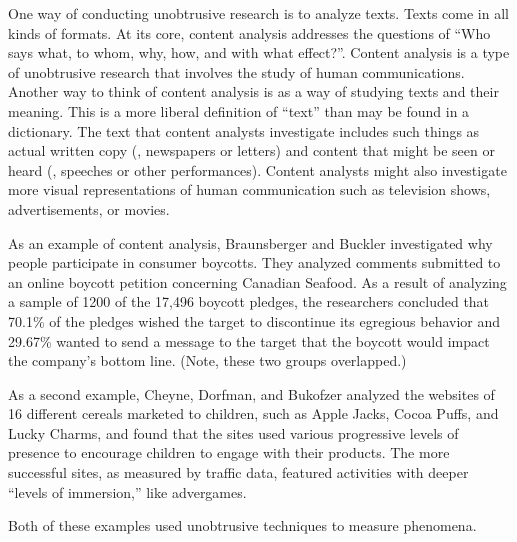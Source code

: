 One way of conducting unobtrusive research is to analyze texts. Texts come in all kinds of formats. At its core, content analysis addresses the questions of ``Who says what, to whom, why, how, and with what effect?''\cite{babbie2010practice}. Content analysis is a type of unobtrusive research that involves the study of human communications. Another way to think of content analysis is as a way of studying texts and their meaning. This is a more liberal definition of ``text'' than may be found in a dictionary. The text that content analysts investigate includes such things as actual written copy (\eg, newspapers or letters) and content that might be seen or heard (\eg, speeches or other performances). Content analysts might also investigate more visual representations of human communication such as television shows, advertisements, or movies.

As an example of content analysis, Braunsberger and Buckler \cite{braunsberger2011motivates} investigated why people participate in consumer boycotts. They analyzed comments submitted to an online boycott petition concerning Canadian Seafood. As a result of analyzing a sample of 1200 of the 17,496 boycott pledges, the researchers concluded that 70.1\% of the pledges wished the target to discontinue its egregious behavior and 29.67\% wanted to send a message to the target that the boycott would impact the company's bottom line. (Note, these two groups overlapped.) 

As a second example, Cheyne, Dorfman, and Bukofzer \cite{cheyne2013marketing} analyzed the websites of 16 different cereals marketed to children, such as Apple Jacks, Cocoa Puffs, and Lucky Charms, and found that the sites used various progressive levels of presence to encourage children to engage with their products. The more successful sites, as measured by traffic data, featured activities with deeper ``levels of immersion,'' like advergames.

Both of these examples used unobtrusive techniques to measure phenomena. 

